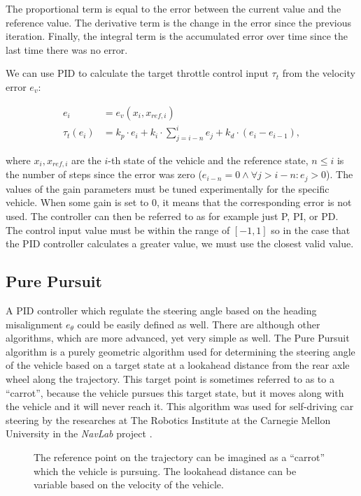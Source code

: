 The proportional term is equal to the error between the current value and the reference value. The derivative term is the change in the error since the previous iteration. Finally, the integral term is the accumulated error over time since the last time there was no error.


We can use \gls*{PID} to calculate the target throttle control input $\tau_t$ from the velocity error $e_v$:

\begin{align*}
	e_i&=e_v(x_i, x_{ref,i}) \\
	\tau_t(e_i)&=k_p \cdot e_i+k_i\cdot\sum_{j=i-n}^{i}e_j + k_d\cdot \left(e_i - e_{i-1}\right),
\end{align*}

where $x_i, x_{ref, i}$ are the  $i$-th state of the vehicle and the reference state, $n\leq i$ is the number of steps since the error was zero ($e_{i-n}=0\land \forall j>i-n: e_j>0$). The values of the gain parameters must be tuned experimentally for the specific vehicle. When some gain is set to $0$, it means that the corresponding error is not used. The controller can then be referred to as for example just P, PI, or PD. The control input value must be within the range of $\left[-1, 1\right]$ so in the case that the \gls*{PID} controller calculates a greater value, we must use the closest valid value. 

\subsection{Pure Pursuit}

A \gls*{PID} controller which regulate the steering angle based on the heading misalignment $e_\theta$ could be easily defined as well. There are although other algorithms, which are more advanced, yet very simple as well. The Pure Pursuit algorithm is a purely geometric algorithm used for determining the steering angle of the vehicle based on a target state at a lookahead distance from the rear axle wheel along the trajectory. This target point is sometimes referred to as to a ``carrot'', because the vehicle pursues this target state, but it moves along with the vehicle and it will never reach it. This algorithm was used for self-driving car steering by the researches at The Robotics Institute at the Carnegie Mellon University in the \textit{NavLab} project \cite{Pure_pursuit}.

\begin{figure}
	\caption{The reference point on the trajectory can be imagined as a ``carrot'' which the vehicle is pursuing. The lookahead distance can be variable based on the velocity of the vehicle.}
	\label{fig:pure_pursuit}
\end{figure}

